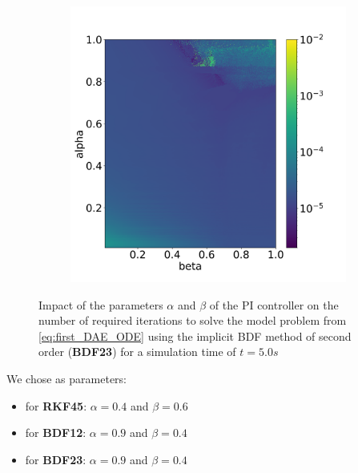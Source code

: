 \documentclass{report}
\begin{document}
\begin{figure}[H]
\begin{subfigure}{0.32\textwidth}
        \label{fig:numberIterationTSBDF23}
    \end{subfigure}
    \begin{subfigure}{0.32\textwidth}
    	\centering
    	\includegraphics[width=1\textwidth]{images/analysis_BDF23_psi.png}
        \label{fig:numberNumericalSchemeBDF23}
    \end{subfigure}
    \caption{Impact of the parameters $\alpha$ and $\beta$ of the PI controller on the number of required iterations to solve the model problem from \autoref{eq:first_DAE_ODE} using the implicit BDF method of second order (\textbf{BDF23}) for a simulation time of $t=5.0s$}
    \label{fig:ParametersPIControllerBDF23}
\end{figure}

We chose as parameters: 
\begin{itemize}
    \item for \textbf{RKF45}: $\alpha=0.4$ and $\beta=0.6$
    \item for \textbf{BDF12}: $\alpha=0.9$ and $\beta=0.4$
    \item for \textbf{BDF23}: $\alpha=0.9$ and $\beta=0.4$
\end{itemize}
\end{document}
